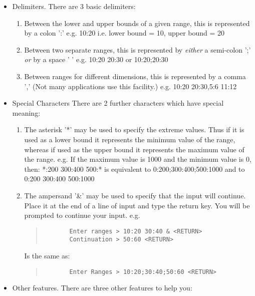\documentclass{book}
\renewcommand{\_}{{\tt\char'137}}     %
\begin{document}
\begin{itemize}
\item Delimiters. There are 3 basic delimiters:

\begin{enumerate}
\item Between the lower and upper bounds of a given range,
this is represented by a colon ':'
e.g. 10:20
i.e. lower bound = 10, upper bound = 20
\item Between two separate ranges,
this is represented by {\em either} a semi-colon ';' {\em or} by a
space ' '
e.g. 10:20 20:30 or 10:20;20:30
\item Between ranges for different dimensions,
this is represented by a comma ','
(Not many applications use this facility.)
e.g. 10:20 20:30,5:6 11:12
\end{enumerate}
\item Special Characters
There are 2 further characters which have special meaning:


\begin{enumerate}
\item The asterisk '*' may be used to specify the extreme
values. Thus if it is used as a lower bound it represents
the minimum value of the range, whereas if used as the
upper bound it represents the maximum value of the range.
e.g. If the maximum value is 1000 and the minimum value
is 0, then:
*:200 300:400 500:*
is equivalent to
0:200;300:400;500:1000
and to
0:200 300:400 500:1000
\item The ampersand '\&' may be used to specify that the input
will continue. Place it at the end of a line of input and
type the return key. You will be prompted to continue
your input.
e.g.
\begin{quote}\begin{verbatim}
       Enter ranges > 10:20 30:40 & <RETURN>
       Continuation > 50:60 <RETURN>
       \end{verbatim}\end{quote}
Is the same as:
\begin{quote}\begin{verbatim}
       Enter Ranges > 10:20;30:40;50:60 <RETURN>
       \end{verbatim}\end{quote}
\end{enumerate}
\item Other features.
There are three other features to help you:


\end{itemize}
\end{document}
